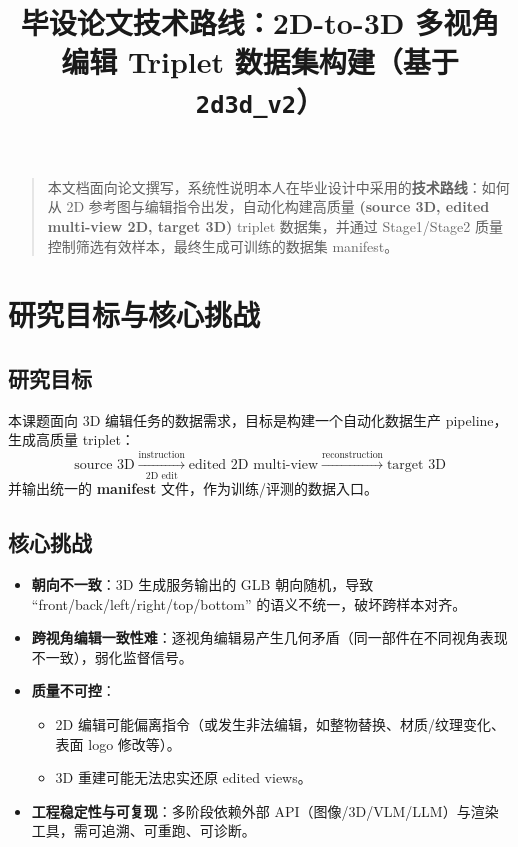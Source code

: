 \documentclass[UTF8,a4paper,11pt]{ctexart}
\title{毕设论文技术路线：2D-to-3D 多视角编辑 Triplet 数据集构建（基于 \texttt{2d3d\_v2}）}
\author{}
\date{}
\begin{document}
\maketitle

\begin{quote}
本文档面向论文撰写，系统性说明本人在毕业设计中采用的\textbf{技术路线}：如何从 2D 参考图与编辑指令出发，自动化构建高质量 \textbf{(source 3D, edited multi-view 2D, target 3D)} triplet 数据集，并通过 Stage1/Stage2 质量控制筛选有效样本，最终生成可训练的数据集 manifest。
\end{quote}

\tableofcontents
\vspace{1em}

\section{研究目标与核心挑战}

\subsection{研究目标}
本课题面向 3D 编辑任务的数据需求，目标是构建一个自动化数据生产 pipeline，生成高质量 triplet：
\[
\text{source 3D} \xrightarrow[\text{2D edit}]{\text{instruction}} \text{edited 2D multi-view} \xrightarrow{\text{reconstruction}} \text{target 3D}
\]
并输出统一的 \textbf{manifest} 文件，作为训练/评测的数据入口。

\subsection{核心挑战}
\begin{itemize}
  \item \textbf{朝向不一致}：3D 生成服务输出的 GLB 朝向随机，导致 ``front/back/left/right/top/bottom'' 的语义不统一，破坏跨样本对齐。
  \item \textbf{跨视角编辑一致性难}：逐视角编辑易产生几何矛盾（同一部件在不同视角表现不一致），弱化监督信号。
  \item \textbf{质量不可控}：
  \begin{itemize}
    \item 2D 编辑可能偏离指令（或发生非法编辑，如整物替换、材质/纹理变化、表面 logo 修改等）。
    \item 3D 重建可能无法忠实还原 edited views。
  \end{itemize}
  \item \textbf{工程稳定性与可复现}：多阶段依赖外部 API（图像/3D/VLM/LLM）与渲染工具，需可追溯、可重跑、可诊断。
\end{itemize}
\end{document}

